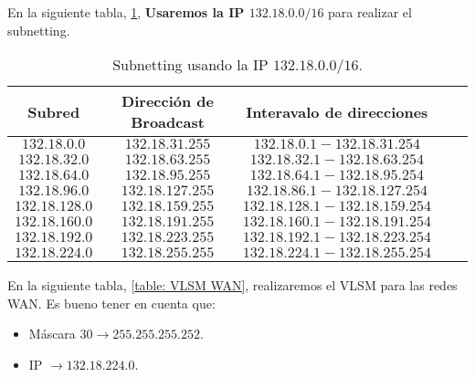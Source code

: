 En la siguiente tabla, \cref{table: subnetting 1}, \textbf{Usaremos la IP \(132.18.0.0/16\)}
para realizar el subnetting.

\begin{table}[ht]
\centering
\caption{Subnetting usando la IP \(132.18.0.0/16\).}
\begin{tabular}[t]{ccccc}
\toprule
\color{EAFIT-blue}\textbf{Subred}&\color{EAFIT-blue}\textbf{Dirección de Broadcast}&\color{EAFIT-blue}\textbf{Interavalo de direcciones}\\
\midrule
\(132.18.0.0\)&\(132.18.31.255\)&\(132.18.0.1 - 132.18.31.254\)\\
\(132.18.32.0\)&\(132.18.63.255\)&\(132.18.32.1 - 132.18.63.254\)\\
\(132.18.64.0\)&\(132.18.95.255\)&\(132.18.64.1 - 132.18.95.254\)\\
\(132.18.96.0\)&\(132.18.127.255\)&\(132.18.86.1 - 132.18.127.254\)\\
\(132.18.128.0\)&\(132.18.159.255\)&\(132.18.128.1 - 132.18.159.254\)\\
\(132.18.160.0\)&\(132.18.191.255\)&\(132.18.160.1 - 132.18.191.254\)\\
\(132.18.192.0\)&\(132.18.223.255\)&\(132.18.192.1 - 132.18.223.254\)\\
\(132.18.224.0\)&\(132.18.255.255\)&\(132.18.224.1 - 132.18.255.254\)\\
\bottomrule
\end{tabular}
\label{table: subnetting 1}
\end{table}

En la siguiente tabla, \cref{table: VLSM WAN}, realizaremos el VLSM para las 
redes WAN. Es bueno tener en cuenta que:

\begin{itemize}
    \item Máscara \(30 \rightarrow 255.255.255.252 \).
    \item IP \(\rightarrow 132.18.224.0 \).
\end{itemize}

